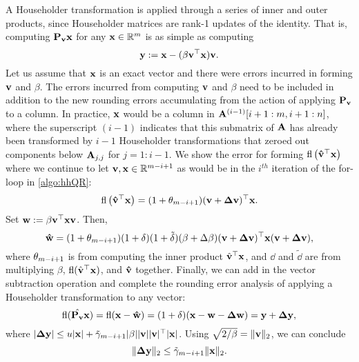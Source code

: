 A Householder transformation is applied through a series of inner and outer products, since Householder matrices are rank-1 updates of the identity. 
That is, computing  $\mathbf{P}_{\mathbf{v}}\mathbf{x}$ for any $\mathbf{x}\in\mathbb{R}^{m}$ is as simple as computing 
\begin{equation}
	\bb{y}:=\bb{x} - (\beta \bb{v}^{\top}\bb{x})\bb{v}.\label{eqn:effH}
\end{equation}
Let us assume that $\mathbf{x}$ is an exact vector and there were errors incurred in forming $\mathbf{v}$ and $\beta$. 
The errors incurred from computing $\mathbf{v}$ and $\beta$ need to be included in addition to the new rounding errors accumulating from the action of applying $\mathbf{P}_{\mathbf{v}}$ to a column.
In practice, $\mathbf{x}$ would be a column in $\mathbf{A}^{(i-1)}[i+1:m, i+1:n]$, where the superscript $(i-1)$ indicates that this submatrix of $\mathbf{A}$ has already been transformed by $i-1$ Householder transformations that zeroed out components below $\mathbf{A}_{j,j}$ for $j = 1:i-1$.
We show the error for forming $\mathrm{fl}\left(\mathbf{\hat{v}}^{\top}\mathbf{x}\right)$ where we continue to let $\mathbf{v},\mathbf{x}\in\mathbb{R}^{m-i+1}$ as would be in the $i^{th}$ iteration of the for-loop in \cref{algo:hhQR}:
\begin{equation*}
\mathrm{fl}\left(\mathbf{\hat{v}}^{\top}\mathbf{x}\right) = (1+\theta_{m-i+1})(\mathbf{v}+\mathbf{\Delta v})^{\top}\mathbf{x}.
\end{equation*}
Set $\mathbf{w}:=\beta\mathbf{v}^{\top}\mathbf{x}\mathbf{v}$.
Then,
\begin{equation*}
\mathbf{\hat{w}} =(1+\theta_{m-i+1})(1+\delta)(1+\tilde{\delta})(\beta+\Delta\beta)(\mathbf{v}+\mathbf{\Delta v})^{\top}\mathbf{x}(\mathbf{v}+\mathbf{\Delta v}),
\end{equation*}
where $\theta_{m-i+1}$ is from computing the inner product $\hat{\mathbf{v}}^{\top}\mathbf{x}$, and $\dd$ and $\tilde{\dd}$ are from multiplying $\beta$, $\mathrm{fl}(\hat{\mathbf{v}}^{\top}\mathbf{x})$, and $\mathbf{\hat{v}}$ together. 
Finally, we can add in the vector subtraction operation and complete the rounding error analysis of applying a Householder transformation to any vector:
\begin{equation}
\fl(\hat{\bb{P_v}}\bb{x}) = \fl(\bb{x}-\bb{\hat{w}}) = (1+\dd)(\bb{x}-\bb{w}-\bb{\Delta w}) = \bb{y} + \bb{\Delta y},\label{eqn:applyP}
\end{equation}
where $|\mathbf{\Delta y}| \leq u|\mathbf{x}| + \tilde{\gamma}_{m-i+1} |\beta||\mathbf{v}||\mathbf{v}|^{\top}|\mathbf{x}|$.
Using $\sqrt{2/\beta} = \|\mathbf{v}\|_2$, we can conclude 
\begin{equation}
\|\bb{\Delta y}\|_2 \leq \tilde{\gamma}_{m-i+1}\|\bb{x}\|_2. \label{eqn:19.2c}
\end{equation} 
